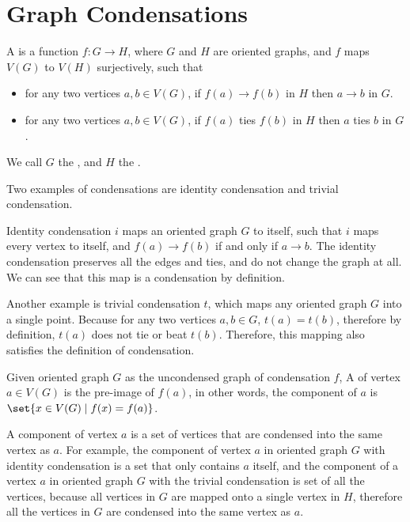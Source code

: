 \section{Graph Condensations}

\begin{definition}
  A  is a function \(f: G \to H\),
  where \(G\) and \(H\) are oriented graphs,
  and \(f\) maps \(V(G)\) to \(V(H)\) surjectively,
  such that
  \begin{itemize}
    \item for any two vertices \(a, b \in V(G)\),
      if \(f(a) \to f(b)\) in \(H\)
      then \(a \to b\) in \(G\).
    \item for any two vertices \(a, b \in V(G)\),
      if \(f(a)\) ties \(f(b)\) in \(H\)
      then \(a\) ties \(b\) in \(G\).
  \end{itemize}
  We call \(G\) the ,
  and \(H\) the .
\end{definition}

Two examples of condensations are identity condensation
and trivial condensation.

Identity condensation \(i\) maps an oriented graph \(G\) to itself,
such that \(i\) maps every vertex to itself,
and \(f(a) \to f(b)\) if and only if \(a \to b\).
The identity condensation preserves all the edges
and ties, and do not change the graph at all.
We can see that this map is a condensation by definition.

Another example is trivial condensation \(t\),
which maps any oriented graph \(G\) into a single point.
Because for any two vertices \(a, b \in G\),
\(t(a) = t(b)\), therefore by definition,
\(t(a)\) does not tie or beat \(t(b)\).
Therefore, this mapping also satisfies
the definition of condensation.

\begin{definition}
  Given oriented graph \(G\) as the uncondensed graph of
  condensation \(f\),
  A  of vertex \(a \in V(G)\)
  is the pre-image of \(f(a)\),
  in other words, the component of \(a\) is
  \(\set{x \in V(G) \mid f(x) = f(a)}\).
\end{definition}

A component of vertex \(a\) is a set of vertices
that are condensed into the same vertex as \(a\).
For example, the component of vertex \(a\)
in oriented graph \(G\) with identity condensation
is a set that only contains \(a\) itself,
and the component of a vertex \(a\) in oriented graph \(G\)
with the trivial condensation is set of all the vertices,
because all vertices in \(G\) are mapped onto a
single vertex in \(H\),
therefore all the vertices in \(G\) are
condensed into the same vertex as \(a\).

